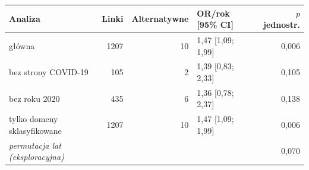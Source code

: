 \begin{tabular}{lrrlr}
\toprule
Analiza & Linki & Alternatywne & OR/rok [95\% CI] & $p$ jednostr. \\
\midrule
główna & 1207 & 10 & 1{,}47 [1{,}09; 1{,}99] & 0{,}006 \\
bez strony COVID-19 & 105 & 2 & 1{,}39 [0{,}83; 2{,}33] & 0{,}105 \\
bez roku 2020 & 435 & 6 & 1{,}36 [0{,}78; 2{,}37] & 0{,}138 \\
tylko domeny sklasyfikowane & 1207 & 10 & 1{,}47 [1{,}09; 1{,}99] & 0{,}006 \\
\textit{permutacja lat (eksploracyjna)} &  &  &  & 0{,}070 \\
\bottomrule
\end{tabular}
